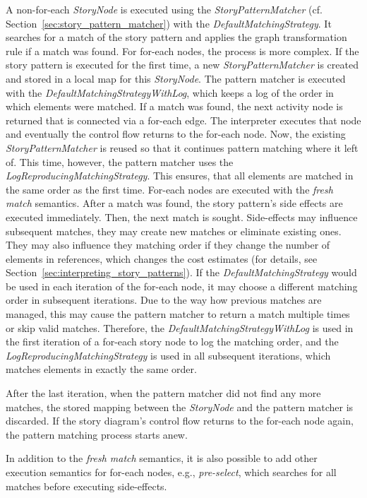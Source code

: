 A non-for-each \emph{StoryNode} is executed using the \emph{StoryPatternMatcher} (cf. Section~\ref{sec:story_pattern_matcher}) with the \emph{DefaultMatchingStrategy}. 
It searches for a match of the story pattern and applies the graph transformation rule if a match was found. 
For for-each nodes, the process is more complex. 
If the story pattern is executed for the first time, a new \emph{StoryPatternMatcher} is created and stored in a local map for this \emph{StoryNode}. 
The pattern matcher is executed with the \emph{DefaultMatchingStrategyWithLog}, which keeps a log of the order in which elements were matched. 
If a match was found, the next activity node is returned that is connected via a for-each edge. 
The interpreter executes that node and eventually the control flow returns to the for-each node.
Now, the existing \emph{StoryPatternMatcher} is reused so that it continues pattern matching where it left of. 
This time, however, the pattern matcher uses the \emph{LogReproducingMatchingStrategy}. 
This ensures, that all elements are matched in the same order as the first time. 
For-each nodes are executed with the \emph{fresh match} semantics. 
After a match was found, the story pattern's side effects are executed immediately. 
Then, the next match is sought. 
Side-effects may influence subsequent matches, they may create new matches or eliminate existing ones. 
They may also influence they matching order if they change the number of elements in references, which changes the cost estimates (for details, see Section~\ref{sec:interpreting_story_patterns}). 
If the \emph{DefaultMatchingStrategy} would be used in each iteration of the for-each node, it may choose a different matching order in subsequent iterations. 
Due to the way how previous matches are managed, this may cause the pattern matcher to return a match multiple times or skip valid matches.
Therefore, the \emph{DefaultMatchingStrategyWithLog} is used in the first iteration of a for-each story node to log the matching order, and the \emph{LogReproducingMatchingStrategy} is used in all subsequent iterations, which matches elements in exactly the same order.

After the last iteration, when the pattern matcher did not find any more matches, the stored mapping between the \emph{StoryNode} and the pattern matcher is discarded. 
If the story diagram's control flow returns to the for-each node again, the pattern matching process starts anew.

In addition to the \emph{fresh match} semantics, it is also possible to add other execution semantics for for-each nodes, e.g., \emph{pre-select}, which searches for all matches before executing side-effects.


